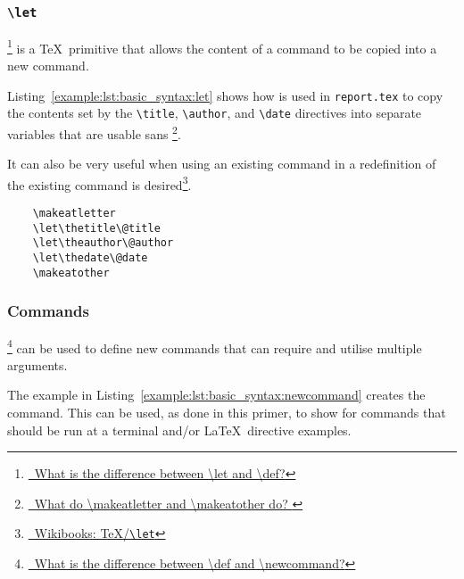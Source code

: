 \subsubsection{\texttt{\textbackslash let}}
\footnote{\href{https://tex.stackexchange.com/questions/258/what-is-the-difference-between-let-and-def}{\faStackExchange\ What is the difference between \textbackslash let and \textbackslash def?}} is a \TeX\ primitive that allows the content of a command to be copied into a new command.

Listing~\ref{example:lst:basic_syntax:let} shows how  is used in \texttt{report.tex} to copy the contents set by the \texttt{\textbackslash title}, \texttt{\textbackslash author}, and \texttt{\textbackslash date} directives into separate variables that are usable sans \footnote{\href{https://tex.stackexchange.com/questions/8351/what-do-makeatletter-and-makeatother-do}{\faStackExchange\ What do \textbackslash makeatletter and \textbackslash makeatother do?
}}.

It can also be very useful when using an existing command in a redefinition of the existing command is desired\footnote{\href{https://en.wikibooks.org/wiki/TeX/let}{\faBook\ Wikibooks: \TeX{}/\texttt{\textbackslash let}}}.

\begin{listing}[H]
  \captionsetup{skip=\skiplistingcaptionlen}
  \begin{verbatim}
    \makeatletter
    \let\thetitle\@title
    \let\theauthor\@author
    \let\thedate\@date
    \makeatother
  \end{verbatim}
  \caption{\texttt{\textbackslash let} command example}
  \label{example:lst:basic_syntax:let}
\end{listing}

\pagebreak
\subsubsection{Commands}
\footnote{\href{https://tex.stackexchange.com/questions/655/what-is-the-difference-between-def-and-newcommand}{\faStackExchange\ What is the difference between \textbackslash def and \textbackslash newcommand?}} can be used to define new commands that can require and utilise multiple arguments.

The example in Listing~\ref{example:lst:basic_syntax:newcommand} creates the  command. This can be used, as done in this primer, to show  for commands that should be run at a terminal and/or \LaTeX\ directive examples.

